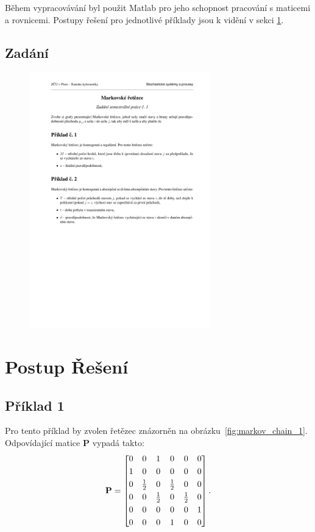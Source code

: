 \documentclass{article}
\begin{document}
Během vypracovávání byl použit Matlab pro jeho schopnost pracování s maticemi a rovnicemi. Postupy řešení pro jednotlivé příklady jsou k vidění v sekci \ref{sec:postup}.




\subsection{Zadání}\label{ssec:zadani}
\begin{figure} [htb!]
    \centering
    \includegraphics[width = 0.7\textwidth]{zadani.pdf}
\end{figure}
\clearpage
\section{Postup Řešení}\label{sec:postup}
\subsection{Příklad 1}
Pro tento příklad by zvolen řetězec znázorněn na obrázku~\ref{fig:markov_chain_1}. Odpovídající matice $\mathbf{P}$ vypadá takto: 
\[
\mathbf{P} =
\begin{bmatrix}
0 & 0 & 1 & 0 & 0 & 0 \\
\addlinespace[3pt]
1 & 0 & 0 & 0 & 0 & 0 \\
\addlinespace[3pt]
0 & \frac{1}{2} & 0 & \frac{1}{2} & 0 & 0 \\
\addlinespace[3pt]
0 & 0 & \frac{1}{2} & 0 & \frac{1}{2} & 0 \\
\addlinespace[3pt]
0 & 0 & 0 & 0 & 0 & 1 \\
\addlinespace[3pt]
0 & 0 & 0 & 1 & 0 & 0 \\
\end{bmatrix}.
\]
\end{document}
